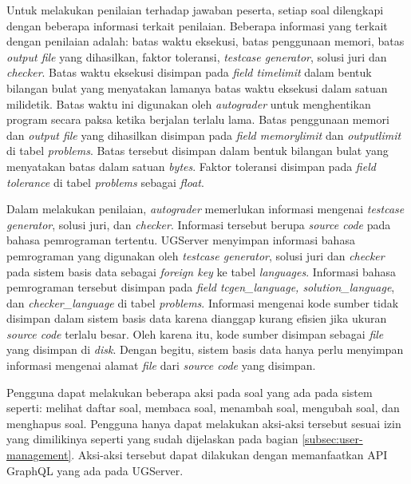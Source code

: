 \par Untuk melakukan penilaian terhadap jawaban peserta, setiap soal dilengkapi dengan beberapa informasi terkait penilaian. Beberapa informasi yang terkait dengan penilaian adalah: batas waktu eksekusi, batas penggunaan memori, batas \textit{output file} yang dihasilkan, faktor toleransi, \textit{testcase generator}, solusi juri dan \textit{checker}. Batas waktu eksekusi disimpan pada \textit{field timelimit} dalam bentuk bilangan bulat yang menyatakan lamanya batas waktu eksekusi dalam satuan milidetik. Batas waktu ini digunakan oleh \textit{autograder} untuk menghentikan program secara paksa ketika berjalan terlalu lama. Batas penggunaan memori dan \textit{output file} yang dihasilkan disimpan pada \textit{field memorylimit} dan \textit{outputlimit} di tabel \textit{problems}. Batas tersebut disimpan dalam bentuk bilangan bulat yang menyatakan batas dalam satuan \textit{bytes}. Faktor toleransi disimpan pada \textit{field tolerance} di tabel \textit{problems} sebagai \textit{float}.

\par Dalam melakukan penilaian, \textit{autograder} memerlukan informasi mengenai \textit{testcase generator}, solusi juri, dan \textit{checker}. Informasi tersebut berupa \textit{source code} pada bahasa pemrograman tertentu. UGServer menyimpan informasi bahasa pemrograman yang digunakan oleh \textit{testcase generator}, solusi juri dan \textit{checker} pada sistem basis data sebagai \textit{foreign key} ke tabel \textit{languages}. Informasi bahasa pemrograman tersebut disimpan pada \textit{field tcgen\_language, solution\_language}, dan \textit{checker\_language} di tabel \textit{problems}. Informasi mengenai kode sumber tidak disimpan dalam sistem basis data karena dianggap kurang efisien jika ukuran \textit{source code} terlalu besar. Oleh karena itu, kode sumber disimpan sebagai \textit{file} yang disimpan di \textit{disk}. Dengan begitu, sistem basis data hanya perlu menyimpan informasi mengenai alamat \textit{file} dari \textit{source code} yang disimpan.


\par Pengguna dapat melakukan beberapa aksi pada soal yang ada pada sistem seperti: melihat daftar soal, membaca soal, menambah soal, mengubah soal, dan menghapus soal. Pengguna hanya dapat melakukan aksi-aksi tersebut sesuai izin yang dimilikinya seperti yang sudah dijelaskan pada bagian \ref{subsec:user-management}. Aksi-aksi tersebut dapat dilakukan dengan memanfaatkan API GraphQL yang ada pada UGServer.

